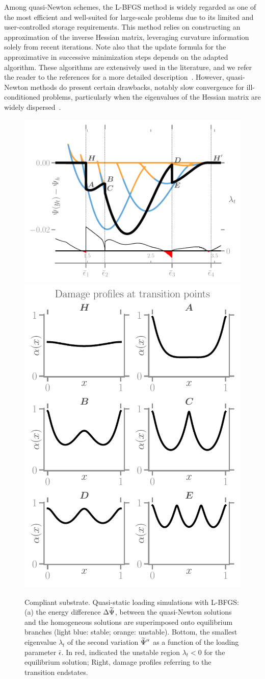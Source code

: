 \documentclass[10pt]{article}
\begin{document}
Among quasi-Newton schemes, the L-BFGS method is widely regarded as one of the most efficient and well-suited for large-scale problems due to its limited and user-controlled storage requirements. This method relies on constructing an approximation of the inverse Hessian matrix, leveraging curvature information solely from recent iterations. Note also that the update formula for the approximative in successive minimization steps depends on the adapted algorithm. These algorithms are extensively used in the literature, and we refer the reader to the references for a more detailed description~\cite{Matthies1979-gl,Xu2001-ax,Nocedal1999-zr,Nocedal2006-qh,Simone2012-tx,Lewis2013-eu,Curtis2015-wp}. However, quasi-Newton methods do present certain drawbacks, notably slow convergence for ill-conditioned problems, particularly when the eigenvalues of the Hessian matrix are widely dispersed~\cite{Simone2012-tx}.
\begin{figure}
    \centering
    \hspace*{-.3cm}
    \includegraphics[width=.6\textwidth]{../images/model_compliant_energy_kick.pdf}
    \includegraphics[width=.4\textwidth]{../images/model_compliant_profiles.pdf}
    \caption{
        Compliant substrate. Quasi-static loading simulations with L-BFGS: (a) the energy difference $\Delta \widetilde\Psi$, between the quasi-Newton solutions and the homogeneous solutions are superimposed onto equilibrium branches (light blue: stable; orange: unstable). Bottom, the smallest eigenvalue $\lambda_t$ of the second variation $\widetilde\Psi''$ as a function of the loading parameter $\bar\epsilon$. In red, indicated the unstable region $\lambda_t<0$ for the equilibrium solution; Right, damage profiles referring to the transition endstates.}
    \label{fig:tempo2}
\end{figure}
\end{document}
